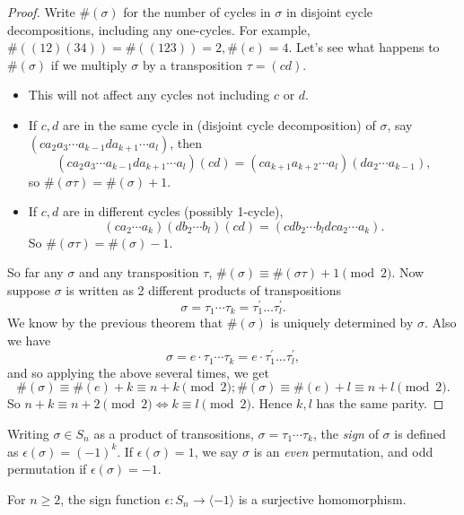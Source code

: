 \documentclass[a4paper]{article}
\begin{document}
    \begin{proof}
        Write $ \#(\sigma) $ for the number of cycles in $ \sigma $ in disjoint cycle decompositions, including any one-cycles. For example, $ \#((12)(34))=\#((123))=2, \#(e)=4 $. Let's see   what happens to $ \#(\sigma) $ if we multiply $ \sigma $ by a transposition $ \tau=(cd) $.
        \begin{itemize}[-]
            \item This will not affect any cycles not including $c$ or $d$.
            \item If $c,d$ are in the same cycle in (disjoint cycle decomposition) of $ \sigma$, say $ (c a_2 a_3 \cdots a_{k-1} d  a_{k+1} \cdots a_l) $, then 
            \[
                (c a_2 a_3 \cdots a_{k-1} d  a_{k+1} \cdots a_l)(cd)=(c a_{k+1} a_{k+2} \cdots a_l)(d a_2 \cdots a_{k-1})
            ,\]
            so $ \#(\sigma \tau) =\#(\sigma)+1$.
            \item If $c,d$ are in different cycles (possibly 1-cycle),
            \[
                (ca_2\cdots a_k)(db_2\cdots b_l)(cd)=(cdb_2\cdots b_ldca_2\cdots a_k)
            .\]
            So $ \# (\sigma\tau)=\#(\sigma)-1 $.
        \end{itemize}
        So far any $ \sigma $ and any transposition $ \tau $, $ \#(\sigma)\equiv\#(\sigma \tau)+1\pmod 2$. Now suppose $ \sigma $ is written as 2 different products of transpositions
        \[
            \sigma=\tau_{1} \cdots \tau_{k}=\tau_{1}^{\prime} \ldots \tau_{l}^{\prime}
        .\]
        We know by the previous theorem that $ \#(\sigma) $ is uniquely determined by $\sigma$. Also we have 
        \[
            \sigma=e\cdot \tau_{1} \cdots \tau_{k}= e\cdot \tau_{1}^{\prime} \ldots \tau_{l}^{\prime} 
        ,\]
        and so applying the above several times, we get 
        \[
            \#(\sigma)\equiv \#(e)+k\equiv n+k\pmod 2; \#(\sigma)\equiv \#(e)+l\equiv n+l\pmod 2
        .\]
        So $ n+k\equiv n+2\pmod 2 \Leftrightarrow k\equiv l\pmod 2 $. Hence $k,l$ has the same parity.
    \end{proof}
    \begin{definition}
        Writing $ \sigma\in S_n $ as a product of transositions, $ \sigma =\tau_{1} \cdots \tau_{k}$, the \textit{sign} of $ \sigma $ is defined as $ \epsilon(\sigma)=(-1)^k $. If $ \epsilon(\sigma)=1 $, we say $ \sigma $ is an \textit{even} permutation, and odd permutation if $ \epsilon(\sigma)=-1 $.
    \end{definition}
    \begin{theorem}\label{thm:2.19}
        For $ n\ge 2 $, the sign function $ \epsilon: S_n\to \langle -1 \rangle $ is a surjective homomorphism.
    \end{theorem}
\end{document}

